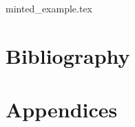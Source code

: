 \documentclass[twoside]{report}
\begin{document}
\pagestyle{empty} %


\cleardoublepage
%
\cleardoublepage
%
\cleardoublepage
{}
\pagestyle{fancy} %

\setcounter{tocdepth}{1}
\tableofcontents

\pagebreak


{minted_example.tex}



\begingroup
	\part{Bibliography}
	
	\renewcommand{\addcontentsline}[3]{}%
	\renewcommand{\section}[2]{}%
	\renewcommand{\chapter}[2]{}%
	
	\label{biblo:mybiblio}
\endgroup

\appendix
	\part{Appendices}

\end{document}
